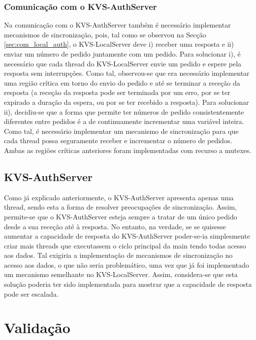 \subsubsection{Comunicação com o KVS-AuthServer}

Na comunicação com o KVS-AuthServer também é necessário implementar mecanismos de sincronização, pois, tal como se observou na Secção \ref{sec:com_local_auth}, o KVS-LocalServer deve i) receber uma resposta e ii) enviar um número de pedido juntamente com um pedido. Para solucionar i), é necessário que cada thread do KVS-LocalServer envie um pedido e espere pela resposta sem interrupções. Como tal, observou-se que era necessário implementar uma região crítica em torno do envio do pedido e até se terminar a receção da resposta (a receção da resposta pode ser terminada por um erro, por se ter expirado a duração da espera, ou por se ter recebido a resposta). Para solucionar ii), decidiu-se que a forma que permite ter números de pedido consistentemente diferentes entre pedidos é a de continuamente incrementar uma variável inteira. Como tal, é necessário implementar um mecanismo de sincronização para que cada thread possa seguramente receber e incrementar o número de pedidos. Ambas as regiões críticas anteriores foram implementadas com recurso a mutexes.

\subsection{KVS-AuthServer}

Como já explicado anteriormente, o KVS-AuthServer apresenta apenas uma thread, sendo esta a forma de resolver preocupações de sincronização. Assim, permite-se que o KVS-AuthServer esteja sempre a tratar de um único pedido desde a sua receção até à resposta. No entanto, na verdade, se se quisesse aumentar a capacidade de resposta do KVS-AuthServer poder-se-ia simplesmente criar mais threads que executassem o ciclo principal da main tendo todas acesso aos dados. Tal exigiria a implementação de mecanismos de sincronização no acesso aos dados, o que não seria problemático, uma vez que já foi implementado um mecanismo semelhante no KVS-LocalServer. Assim, considera-se que esta solução poderia ter sido implementada para mostrar que a capacidade de resposta pode ser escalada.

\section{Validação}

